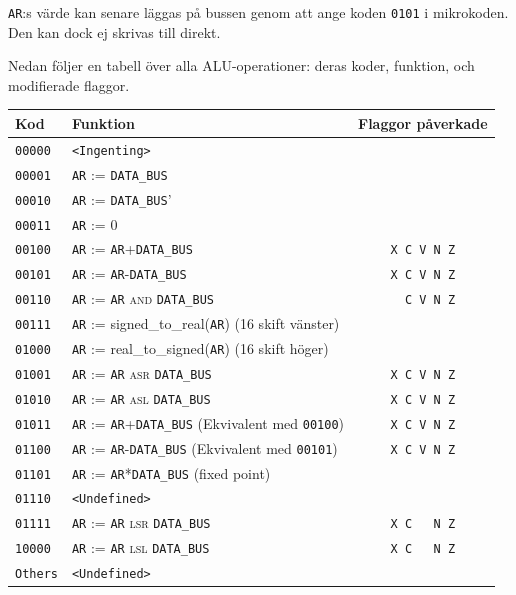 \documentclass[]{article}
\begin{document}
\texttt{AR}:s värde kan senare läggas på bussen genom att ange koden \texttt{0101} i mikrokoden. Den kan dock ej skrivas till direkt.

Nedan följer en tabell över alla ALU-operationer: deras koder, funktion, och modifierade flaggor.
\\

\begin{tabular}{llc}
	\textbf{Kod}    & \textbf{Funktion}                                                                & \textbf{Flaggor påverkade} \\ \hline
	\texttt{00000}  & \texttt{<Ingenting>}                                                             &  \\
	\texttt{00001}  & \texttt{AR} := \texttt{DATA\_BUS}                                                &  \\
	\texttt{00010}  & \texttt{AR} := \texttt{DATA\_BUS}'                                               &  \\
	\texttt{00011}  & \texttt{AR} := 0                                                                 &  \\
	\texttt{00100}  & \texttt{AR} := \texttt{AR}+\texttt{DATA\_BUS}                                    &  \texttt{X C V N Z}     \\
	\texttt{00101}  & \texttt{AR} := \texttt{AR}-\texttt{DATA\_BUS}                                    &  \texttt{X C V N Z}     \\
	\texttt{00110}  & \texttt{AR} := \texttt{AR} \textsc{and} \texttt{DATA\_BUS}                       &  \texttt{{ } C V N Z}    \\
	\texttt{00111}  & \texttt{AR} := signed\_to\_real(\texttt{AR}) (16 skift vänster)                  &  \\
	\texttt{01000}  & \texttt{AR} := real\_to\_signed(\texttt{AR}) (16 skift höger)                    &  \\
	\texttt{01001}  & \texttt{AR} := \texttt{AR} \textsc{asr} \texttt{DATA\_BUS}                       &  \texttt{X C V N Z}     \\
	\texttt{01010}  & \texttt{AR} := \texttt{AR} \textsc{asl} \texttt{DATA\_BUS}                       &  \texttt{X C V N Z}     \\
	\texttt{01011}  & \texttt{AR} := \texttt{AR}+\texttt{DATA\_BUS} (Ekvivalent med \texttt{00100})    &  \texttt{X C V N Z}     \\
	\texttt{01100}  & \texttt{AR} := \texttt{AR}-\texttt{DATA\_BUS} (Ekvivalent med \texttt{00101})    &  \texttt{X C V N Z}     \\
	\texttt{01101}  & \texttt{AR} := \texttt{AR}*\texttt{DATA\_BUS} (fixed point)                      &  \\
	\texttt{01110}  & \texttt{<Undefined>}                                   &  \\
	\texttt{01111}  & \texttt{AR} := \texttt{AR} \textsc{lsr} \texttt{DATA\_BUS}                       &  \texttt{X C { } N Z}    \\
	\texttt{10000}  & \texttt{AR} := \texttt{AR} \textsc{lsl} \texttt{DATA\_BUS}                       &  \texttt{X C { } N Z}    \\
	\texttt{Others} & \texttt{<Undefined>}                                   &
\end{tabular}
\end{document}
